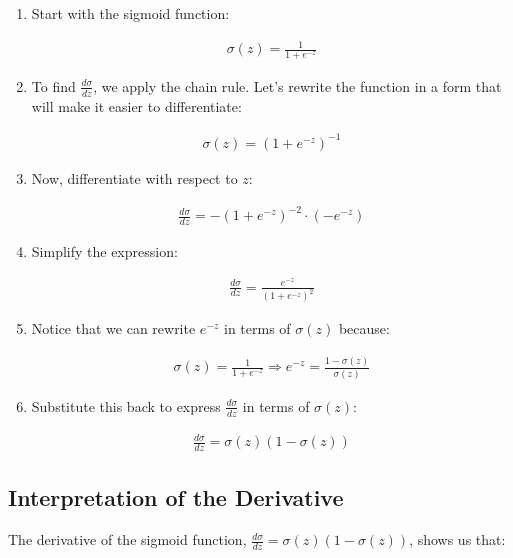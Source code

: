 \documentclass[
  12 pt,
  a4paper,
]{book}
\numberwithin{equation}{section}
\theoremstyle{plain}      %
\theoremstyle{definition} %
\theoremstyle{remark}     %
\theoremstyle{note}         %
\begin{document}
\begin{enumerate}
\def\labelenumi{\arabic{enumi}.}
\item
  Start with the sigmoid function:

  \begin{align}
  \sigma(z) = \frac{1}{1 + e^{-z}}
  \end{align}
\item
  To find \(\frac{d\sigma}{dz}\), we apply the chain rule. Let's rewrite
  the function in a form that will make it easier to differentiate:

  \begin{align}
  \sigma(z) = \left(1 + e^{-z}\right)^{-1}
  \end{align}
\item
  Now, differentiate with respect to \(z\):

  \begin{align}
  \frac{d\sigma}{dz} = -\left(1 + e^{-z}\right)^{-2} \cdot (-e^{-z})
  \end{align}
\item
  Simplify the expression:

  \begin{align}
  \frac{d\sigma}{dz} = \frac{e^{-z}}{\left(1 + e^{-z}\right)^2}
  \end{align}
\item
  Notice that we can rewrite \(e^{-z}\) in terms of \(\sigma(z)\)
  because:

  \begin{align}
  \sigma(z) = \frac{1}{1 + e^{-z}} \Rightarrow e^{-z} = \frac{1 - \sigma(z)}{\sigma(z)}
  \end{align}
\item
  Substitute this back to express \(\frac{d\sigma}{dz}\) in terms of
  \(\sigma(z)\):

  \begin{align}
  \frac{d\sigma}{dz} = \sigma(z)(1 - \sigma(z))
  \end{align}
\end{enumerate}

\hypertarget{interpretation-of-the-derivative}{%
\subsection{Interpretation of the
Derivative}\label{interpretation-of-the-derivative}}

The derivative of the sigmoid function,
\(\frac{d\sigma}{dz} = \sigma(z)(1 - \sigma(z))\), shows us that:
\end{document}
